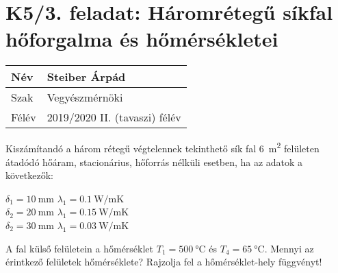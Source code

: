 
\section*{K5/3. feladat: Háromrétegű síkfal hőforgalma és hőmérsékletei}


\begin{tabular}{ | p{2cm} | p{14cm} | } 
	\hline
	Név & Steiber Árpád \\ 
	\hline
	Szak & Vegyészmérnöki \\ 
	\hline
	Félév & 2019/2020 II. (tavaszi) félév \\ 
	\hline
\end{tabular}
\vspace{0.5cm}

\noindent Kiszámítandó a három rétegű végtelennek tekinthető sík fal \SI{6}{\meter\squared} felületen átadódó hőáram, stacionárius, hőforrás nélküli esetben, ha az adatok a következők:
\begin{center}
	$\delta_1 = \SI{10}{\milli\meter}$ $\lambda_1 = \SI{0.1}{\watt\per\meter\kelvin}$ \\
	\vspace{2mm}
	$\delta_2 = \SI{20}{\milli\meter}$ $\lambda_1 = \SI{0.15}{\watt\per\meter\kelvin}$ \\
	\vspace{2mm}
	$\delta_2 = \SI{30}{\milli\meter}$ $\lambda_1 = \SI{0.03}{\watt\per\meter\kelvin}$ \\
\end{center}

\vspace{2mm}

 A fal külső felületein a hőmérséklet $T_1 = \SI{500}{\celsius}$ és $T_4 = \SI{65}{\celsius}$. Mennyi az érintkező felületek hőmérséklete? Rajzolja fel a hőmérséklet-hely függvényt!
 
\vspace{2mm}

